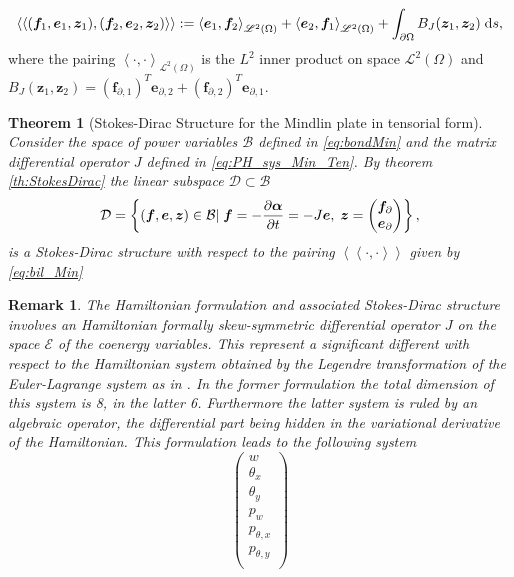 \documentclass[preprint,12pt]{elsarticle}
\newtheorem{theorem}{Theorem}
\newtheorem{remark}{Remark}
\begin{document}
{\begin{equation}
\label{eq:bil_Min}
\left\langle \left\langle (\bm{f}_1, \bm{e}_1, \bm{z}_1), (\bm{f}_2, \bm{e}_2, \bm{z}_2) \right\rangle \right\rangle :=  \left\langle \bm{e}_1, \bm{f}_2 \right\rangle_{\mathscr{L}^2(\Omega)}  +  \left\langle \bm{e}_2,  \bm{f}_1  \right\rangle_{\mathscr{L}^2(\Omega)} + \int_{\partial \Omega} B_J(\bm{z}_1, \bm{z}_2) \d{s} , 
\end{equation}
where the pairing $\left\langle \cdot, \cdot \right\rangle_{\mathscr{L}^2(\Omega)}$ is the $L^2$ inner product on space $\mathscr{L}^2(\Omega)$ and $B_J(\bm{z}_1, \bm{z}_2) = (\bm{f}_{\partial, 1})^T \bm{e}_{\partial, 2} + (\bm{f}_{\partial, 2}) ^T \bm{e}_{\partial, 1}$. 
\begin{theorem}[Stokes-Dirac Structure for the Mindlin plate in tensorial form]
	Consider the space of power variables $\mathcal{B}$ defined in \eqref{eq:bondMin} and the matrix differential operator $J$ defined in \eqref{eq:PH_sys_Min_Ten}. By theorem \ref{th:StokesDirac} the linear subspace $\mathcal{D} \subset \mathcal{B}$
	\begin{equation}
	\mathcal{D} =  \left\{(\bm{f}, \bm{e},\bm{z}) \in \mathcal{B} | \; \bm{f} = - \diffp{\bm{\alpha}}{t} = -J\bm{e}, \; \bm{z} = \begin{pmatrix} \bm{f}_{\partial} \\ \bm{e}_{\partial} \end{pmatrix} 
	\right\},
	\end{equation}
	is a Stokes-Dirac structure with respect to the pairing $\left\langle \left\langle \cdot, \cdot \right\rangle \right\rangle$ given by \eqref{eq:bil_Min}
\end{theorem}
\begin{remark}
	The Hamiltonian formulation and associated Stokes-Dirac structure involves an Hamiltonian formally skew-symmetric differential operator $J$ on the space $\mathcal{E}$ of the coenergy variables. This represent a significant different with respect to the Hamiltonian system obtained by the Legendre transformation of the Euler-Lagrange system as in \cite{jetMin}. In the former formulation the total dimension of this system is 8, in the latter 6. Furthermore the latter system is ruled by an algebraic operator, the differential part being hidden in the variational derivative of the Hamiltonian. This formulation leads to the following system
	\begin{equation}
	\begin{pmatrix}
	w\\ \theta_x\\ \theta_y\\p_w\\p_{\theta, x}\\p_{\theta, y}\\

\end{pmatrix}
\end{equation}
\end{remark}}
\end{document}
